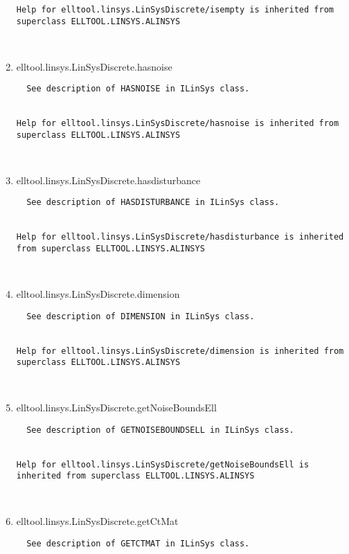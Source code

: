 \begin{enumerate}
\begin{lstlisting}
Help for elltool.linsys.LinSysDiscrete/isempty is inherited from superclass ELLTOOL.LINSYS.ALINSYS



\end{lstlisting}
\fontfamily{\familydefault}
\selectfont
\item {elltool.linsys.LinSysDiscrete.hasnoise}
\selectfont
\begin{lstlisting}
  See description of HASNOISE in ILinSys class.


Help for elltool.linsys.LinSysDiscrete/hasnoise is inherited from superclass ELLTOOL.LINSYS.ALINSYS



\end{lstlisting}
\fontfamily{\familydefault}
\selectfont
\item {elltool.linsys.LinSysDiscrete.hasdisturbance}
\selectfont
\begin{lstlisting}
  See description of HASDISTURBANCE in ILinSys class.


Help for elltool.linsys.LinSysDiscrete/hasdisturbance is inherited from superclass ELLTOOL.LINSYS.ALINSYS



\end{lstlisting}
\fontfamily{\familydefault}
\selectfont
\item {elltool.linsys.LinSysDiscrete.dimension}
\selectfont
\begin{lstlisting}
  See description of DIMENSION in ILinSys class.


Help for elltool.linsys.LinSysDiscrete/dimension is inherited from superclass ELLTOOL.LINSYS.ALINSYS



\end{lstlisting}
\fontfamily{\familydefault}
\selectfont
\item {elltool.linsys.LinSysDiscrete.getNoiseBoundsEll}
\selectfont
\begin{lstlisting}
  See description of GETNOISEBOUNDSELL in ILinSys class.


Help for elltool.linsys.LinSysDiscrete/getNoiseBoundsEll is inherited from superclass ELLTOOL.LINSYS.ALINSYS



\end{lstlisting}
\fontfamily{\familydefault}
\selectfont
\item {elltool.linsys.LinSysDiscrete.getCtMat}
\selectfont
\begin{lstlisting}
  See description of GETCTMAT in ILinSys class.



\end{lstlisting}
\end{enumerate}
